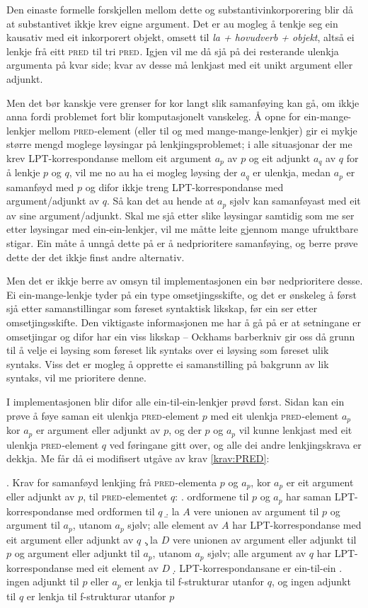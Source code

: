 \documentclass[11pt,a4paper,oneside,draft]{report}
\newcommand{\F}[2]{\textsc{#1}\ensuremath{_{#2}}}
\newcommand{\PRED}{\F{pred}{}}
\begin{document}
Den einaste formelle forskjellen mellom dette og
substantivinkorporering blir då at substantivet ikkje krev eigne
argument. Det er au mogleg å tenkje seg ein kausativ med eit
inkorporert objekt, omsett til \emph{la + hovudverb + objekt}, altså ei
lenkje frå eitt \PRED{} til tri \PRED{}. Igjen vil me då sjå på dei resterande
ulenkja argumenta på kvar side; kvar av desse må lenkjast med eit
unikt argument eller adjunkt.

Men det bør kanskje vere grenser for kor langt slik samanføying kan
gå, om ikkje anna fordi problemet fort blir komputasjonelt
vanskeleg. Å opne for ein-mange-lenkjer mellom \PRED{}-element (eller til
og med mange-mange-lenkjer) gir ei mykje større mengd moglege
løysingar på lenkjingsproblemet; i alle situasjonar der me krev
LPT-korrespondanse mellom eit argument $a_p$ av $p$ og eit adjunkt
$a_q$ av $q$ for å lenkje $p$ og $q$, vil me no au ha ei mogleg
løysing der $a_q$ er ulenkja, medan $a_p$ er samanføyd med $p$ og
difor ikkje treng LPT-korrespondanse med argument/adjunkt av $q$. Så
kan det au hende at $a_p$ sjølv kan samanføyast med eit av sine
argument/adjunkt. Skal me sjå etter slike løysingar samtidig som me
ser etter løysingar med ein-ein-lenkjer, vil me måtte leite gjennom
mange ufruktbare stigar. Ein måte å unngå dette på er å nedprioritere
samanføying, og berre prøve dette der det ikkje finst andre
alternativ.

Men det er ikkje berre av omsyn til implementasjonen ein bør
nedprioritere desse. Ei ein-mange-lenkje tyder på ein type
omsetjingsskifte, og det er ønskeleg å først sjå etter samanstillingar
som føreset syntaktisk likskap, før ein ser etter
omsetjingsskifte. Den viktigaste informasjonen me har å gå på er at
setningane er omsetjingar og difor har ein viss likskap -- Ockhams
barberkniv gir oss då grunn til å velje ei løysing som føreset lik
syntaks over ei løysing som føreset ulik syntaks. Viss det er mogleg å
opprette ei samanstilling på bakgrunn av lik syntaks, vil me
prioritere denne.

I implementasjonen blir difor alle ein-til-ein-lenkjer prøvd
først. Sidan kan ein prøve å føye saman eit ulenkja \PRED{}-element
$p$ med eit ulenkja \PRED{}-element $a_p$ kor $a_p$ er argument eller
adjunkt av $p$, og der $p$ og $a_p$ vil kunne lenkjast med eit ulenkja
\PRED{}-element $q$ ved føringane gitt over, og alle dei andre
lenkjingskrava er dekkja. Me får då ei modifisert utgåve av krav
\ref{krav:PRED}:

\ex. \label{krav:f-ein-mange} Krav for samanføyd lenkjing frå \PRED{}-elementa
$p$ og $a_p$, kor $a_p$ er eit argument eller adjunkt av $p$, til \PRED{}-elementet $q$:
\a. ordformene til $p$ og $a_p$ har saman LPT-korrespondanse med ordformen til $q$
\b. la $A$ vere unionen av argument til $p$ og argument til $a_p$,
    utanom $a_p$ sjølv;
    alle element av $A$ har LPT-korrespondanse med eit argument eller adjunkt av $q$
\c. la $D$ vere unionen av argument eller adjunkt til $p$ og argument
    eller adjunkt til $a_p$, utanom $a_p$ sjølv;
    alle argument av $q$ har LPT-korrespondanse med eit element av $D$
\d. LPT-korrespondansane er ein-til-ein
\e. ingen adjunkt til $p$ eller $a_p$ er lenkja til f-strukturar utanfor $q$, og ingen
    adjunkt til $q$ er lenkja til f-strukturar utanfor $p$
\end{document}
